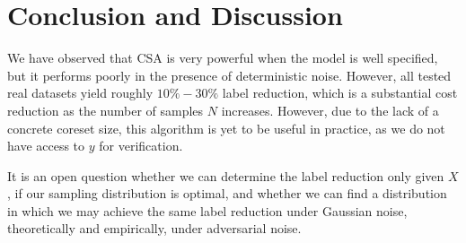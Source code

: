 \section{Conclusion and Discussion}

We have observed that CSA is very powerful when the model is well specified, but it performs poorly in the presence of deterministic noise. However, all tested real datasets yield roughly $10\%-30\%$ label reduction, which is a substantial cost reduction as the number of samples $N$ increases. However, due to the lack of a concrete coreset size, this algorithm is yet to be useful in practice, as we do not have access to $y$ for verification.

It is an open question whether we can determine the label reduction only given $X$, if our sampling distribution is optimal, and whether we can find a distribution in which we may achieve the same label reduction under Gaussian noise, theoretically and empirically, under adversarial noise.\\

